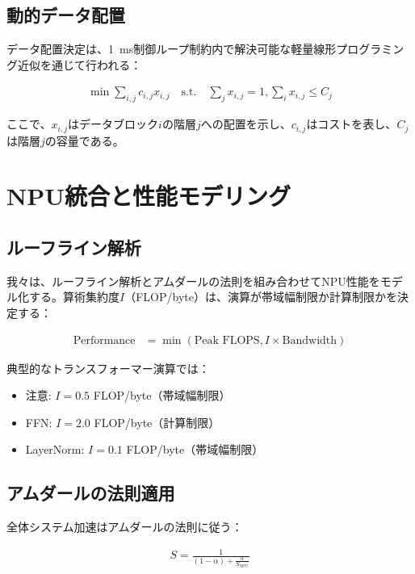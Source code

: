 \documentclass[10pt,twocolumn,a4paper]{jarticle}
\begin{document}
\subsection{動的データ配置}

データ配置決定は、\SI{1}{ms}制御ループ制約内で解決可能な軽量線形プログラミング近似を通じて行われる：

\begin{align}
\min \sum_{i,j} c_{i,j} x_{i,j} \quad \text{s.t.} \quad \sum_j x_{i,j} = 1, \sum_i x_{i,j} \leq C_j \label{eq:placement}
\end{align}

ここで、$x_{i,j}$はデータブロック$i$の階層$j$への配置を示し、$c_{i,j}$はコストを表し、$C_j$は階層$j$の容量である。

\section{NPU統合と性能モデリング}

\subsection{ルーフライン解析}

我々は、ルーフライン解析とアムダールの法則を組み合わせてNPU性能をモデル化する。算術集約度$I$（FLOP/byte）は、演算が帯域幅制限か計算制限かを決定する：

\begin{align}
\text{Performance} &= \min(\text{Peak FLOPS}, I \times \text{Bandwidth}) \label{eq:roofline}
\end{align}

典型的なトランスフォーマー演算では：
\begin{itemize}
\item 注意: $I = 0.5$ FLOP/byte（帯域幅制限）
\item FFN: $I = 2.0$ FLOP/byte（計算制限）
\item LayerNorm: $I = 0.1$ FLOP/byte（帯域幅制限）
\end{itemize}

\subsection{アムダールの法則適用}

全体システム加速はアムダールの法則に従う：

\begin{align}
S = \frac{1}{(1-\alpha) + \frac{\alpha}{S_{\text{NPU}}}} \label{eq:amdahl}
\end{align}
\end{document}
